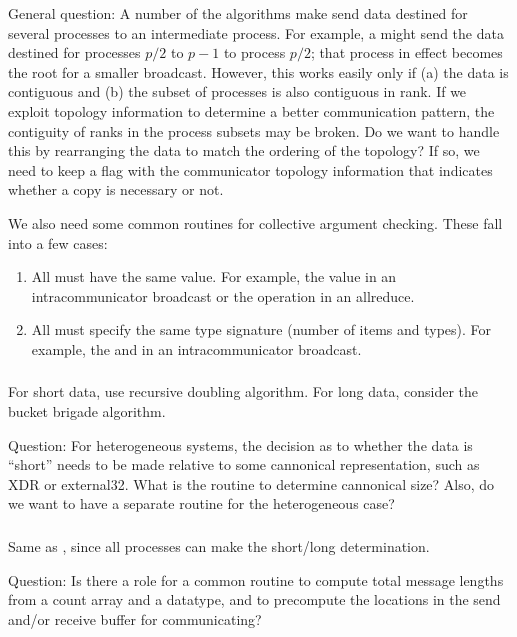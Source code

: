 \documentclass{article}
\begin{document}
General question:  A number of the algorithms make send data destined
for several processes to an intermediate process.  For example, a
 might send the data destined for processes $p/2$
to $p-1$ to process $p/2$; that process in effect becomes the root for
a smaller broadcast.  However, this works easily only if (a) the data
is contiguous and (b) the subset of processes is also contiguous in
rank.  If we exploit topology information to determine a better
communication pattern, the contiguity of ranks in the process subsets
may be broken.  Do we want to handle this by rearranging the data to
match the ordering of the topology?  If so, we need to keep a flag
with the communicator topology information that indicates whether a copy is
necessary or not. 

We also need some common routines for collective argument checking.  These
fall into a few cases:
\begin{enumerate}
\item All must have the same value.  For example, the  value in an
  intracommunicator broadcast or the operation in an allreduce.
\item All must specify the same type signature (number of items and types).
  For example, the  and  in an intracommunicator
  broadcast.
\end{enumerate}

\subsubsection{}
For short data, use recursive doubling algorithm.  For long data, consider the
bucket brigade algorithm.

Question:  For heterogeneous systems, the decision as to whether the
data is ``short'' needs to be made relative to some cannonical
representation, such as XDR or external32.  What is the routine to
determine cannonical size?  Also, do we want to have a separate routine for
the heterogeneous case?

\subsubsection{}
Same as , since all processes can make the
short/long determination.

Question: Is there a role for a common routine to compute total message
lengths from a count array and a datatype, and to precompute the locations in
the send and/or receive buffer for communicating?
\end{document}
